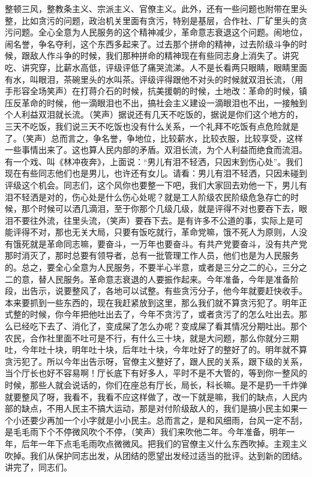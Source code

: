 整顿三风，整教条主义、宗派主义、官僚主义。此外，还有一些问题也附带在里头整，比如贪污的问题，政治机关里面有贪污，特别是基层，合作社、厂矿里头的贪污问题。全心全意为人民服务的这个精神减少，革命意志衰退这个问题。闹地位，闹名誉，争名夺利，这个东西多起来了。过去那个拼命的精神，过去阶级斗争的时候，跟敌人作斗争的时候，我们那种拼命的精神现在有些同志身上消失了。讲究吃、讲究穿，比薪水高低，评级评低了痛哭流涕。人不是长看两只眼睛，眼睛里面有水，叫眼泪，茶碗里头的水叫茶。评级评得跟他不对头的时候就双泪长流，（用手形容全场笑声）在打蒋介石的时候，抗美援朝的时候，土地改：革命的时候，镇压反革命的时候，他一滴眼泪也不出，搞社会主义建设一滴眼泪也不出，一接触到个人利益双泪就长流。（笑声）据说还有几天不吃饭的，据说是你们这个地方的，三天不吃饭，我们说三天不吃饭也没有什么关系，一个礼拜不吃饭有点危险就是了。（笑声）总而言之，争名誉，争地位，比较薪水，比较衣服，比较享受，这样一些事情出来了。这也算人民内部的矛盾。双泪长流，为个人利益而绝食而流泪。有一个戏、叫《林冲夜奔》，上面说：“男儿有泪不轻洒，只因末到伤心处”。我们现在有些同志他们也是男儿，也许还有女儿。请看：男儿有泪不轻洒，只因未碰到评级这个机会。同志们，这个风你也要整一下吧，我们大家回去劝他一下，男儿有泪不轻洒是对的，伤心处是什么伤心处呢？就是工人阶级农民阶级危急存亡的时候，那个时候可以洒几滴泪，至于你那个几级几级，就是评得不对也要吞下去，眼泪不要往外流，往里头流，（笑声）要吞下去。是有许多不公道的事，实际上是可能评得不对，那也无关大局，只要有饭吃就行，革命党嘛，饿不死人为原则，人没有饿死就是革命同志嘛，要奋斗，一万年也要奋斗。有共产党要奋斗，没有共产党那时消灭了，那时总要有领导者，总有一批管理工作人员，他们也是为人民服务的。总之，要全心全意为人民服务，不要半心半意，或者是三分之二的心，三分之二的意，替人民服务。革命意志衰退的人要振作起来。今年准备，今年是准备阶段，出告示，说要整风了，各地可以试整。有些贪污分子，他今年就要赶快收手。本来要抓到一些东西的，现在我赶紧放到这里，那么我们就不算贪污犯了。明年正式整的时候，你今年把他吐出去了，今年不贪污了，或者贪污了的怎么吐出去。那么已经吃下去了、消化了，变成屎了怎么办呢？变成屎了看其情况分期吐出。那个农民，合作社里面不吐可是不行，有什么三十块，就是大问题，那么你就分三期吐，今年吐十块，明年吐十块，后年吐十块，今年吐好了的整好了的。明年就不算贪污犯了。所以今年出告示呀，官僚主义整好了，跟人民的关系，跟下级的关系，当个厅长也好不容易啊！厅长底下有好多人，平时不是不大管的，等到你一整风的时候，那些人就会说话的，你们在座总有厅长，局长，科长嘛。是不是扔一千炸弹就要整风了呀，我看不，我看不应这样做了，改一下就是嘛，我们的缺点，人民内部的缺点，不用人民主不搞大运动，那是对付阶级敌人的，我们是搞小民主如果一个小还要少再加一个小字就是小小民主。总而言之，是和风细雨，台风一定不刮，是毛毛雨下个不停微风吹个不停，（笑声）我们来吹他二年。今年准备，明年一年，后年一年下点毛毛雨吹点微微风。把我们的官僚主义什么东西吹掉。主观主义吹掉。我们从保护同志出发，从团结的愿望出发经过适当的批评。达到新的团结。讲完了，同志们。


